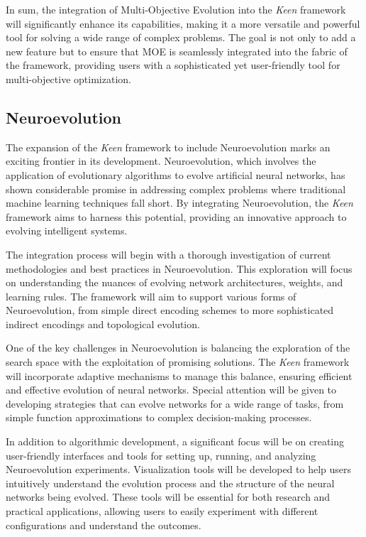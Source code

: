         In sum, the integration of Multi-Objective Evolution into the \textit{Keen} framework will significantly enhance 
        its capabilities, making it a more versatile and powerful tool for solving a wide range of complex problems. The 
        goal is not only to add a new feature but to ensure that MOE is seamlessly integrated into the fabric of the 
        framework, providing users with a sophisticated yet user-friendly tool for multi-objective optimization.

    \subsection{Neuroevolution}
    \label{sec:future:ne}
        The expansion of the \textit{Keen} framework to include Neuroevolution marks an exciting frontier in its 
        development. Neuroevolution, which involves the application of evolutionary algorithms to evolve artificial 
        neural networks, has shown considerable promise in addressing complex problems where traditional machine 
        learning techniques fall short. By integrating Neuroevolution, the \textit{Keen} framework aims to harness this 
        potential, providing an innovative approach to evolving intelligent systems.

        The integration process will begin with a thorough investigation of current methodologies and best practices in 
        Neuroevolution. This exploration will focus on understanding the nuances of evolving network architectures, 
        weights, and learning rules. The framework will aim to support various forms of Neuroevolution, from simple 
        direct encoding schemes to more sophisticated indirect encodings and topological evolution. 

        One of the key challenges in Neuroevolution is balancing the exploration of the search space with the 
        exploitation of promising solutions. The \textit{Keen} framework will incorporate adaptive mechanisms to manage 
        this balance, ensuring efficient and effective evolution of neural networks. Special attention will be given to 
        developing strategies that can evolve networks for a wide range of tasks, from simple function approximations to 
        complex decision-making processes.

        In addition to algorithmic development, a significant focus will be on creating user-friendly interfaces and 
        tools for setting up, running, and analyzing Neuroevolution experiments. Visualization tools will be developed 
        to help users intuitively understand the evolution process and the structure of the neural networks being 
        evolved. These tools will be essential for both research and practical applications, allowing users to easily 
        experiment with different configurations and understand the outcomes.

